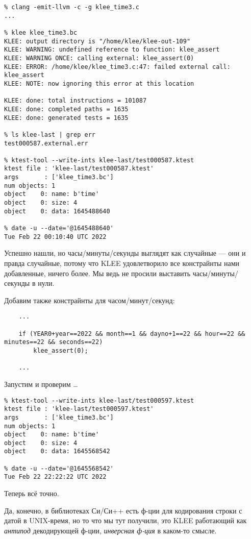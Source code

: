 

\begin{lstlisting}
% clang -emit-llvm -c -g klee_time3.c
...

% klee klee_time3.bc
KLEE: output directory is "/home/klee/klee-out-109"
KLEE: WARNING: undefined reference to function: klee_assert
KLEE: WARNING ONCE: calling external: klee_assert(0)
KLEE: ERROR: /home/klee/klee_time3.c:47: failed external call: klee_assert
KLEE: NOTE: now ignoring this error at this location

KLEE: done: total instructions = 101087
KLEE: done: completed paths = 1635
KLEE: done: generated tests = 1635

% ls klee-last | grep err
test000587.external.err

% ktest-tool --write-ints klee-last/test000587.ktest
ktest file : 'klee-last/test000587.ktest'
args       : ['klee_time3.bc']
num objects: 1
object    0: name: b'time'
object    0: size: 4
object    0: data: 1645488640

% date -u --date='@1645488640'
Tue Feb 22 00:10:40 UTC 2022
\end{lstlisting}

Успешно нашли, но часы/минуты/секунды выглядят как случайные --- они и правда случайные, потому что KLEE удовлетворило
все констрайнты нами добавленные, ничего более.
Мы ведь не просили выставить часы/минуты/секунды в нули.

Добавим также констрайнты для часом/минут/секунд:

\begin{lstlisting}
	...

	if (YEAR0+year==2022 && month==1 && dayno+1==22 && hour==22 && minutes==22 && seconds==22)
		klee_assert(0);
	
	...
\end{lstlisting}

Запустим и проверим \dots

\begin{lstlisting}
% ktest-tool --write-ints klee-last/test000597.ktest
ktest file : 'klee-last/test000597.ktest'
args       : ['klee_time3.bc']
num objects: 1
object    0: name: b'time'
object    0: size: 4
object    0: data: 1645568542

% date -u --date='@1645568542'
Tue Feb 22 22:22:22 UTC 2022
\end{lstlisting}

Теперь всё точно.

Да, конечно, в библиотеках Си/Си++ есть ф-ции для кодирования строки с датой в UNIX-время, но то что мы тут получили,
это KLEE работающий как \textit{антипод} декодирующей ф-ции, \textit{инверсная ф-ция} в каком-то смысле.
